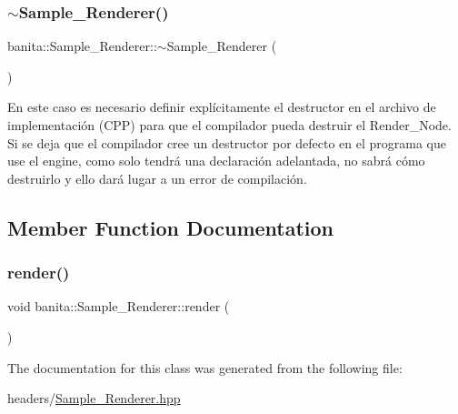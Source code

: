 \mbox{\label{classbanita_1_1_sample___renderer_a6e8c46345456cc3975348b2d79924183}} 
\subsubsection{\texorpdfstring{$\sim$Sample\_Renderer()}{~Sample\_Renderer()}}
{\footnotesize\ttfamily banita\+::\+Sample\+\_\+\+Renderer\+::$\sim$\+Sample\+\_\+\+Renderer (\begin{DoxyParamCaption}{ }\end{DoxyParamCaption})}

En este caso es necesario definir explícitamente el destructor en el archivo de implementación (C\+PP) para que el compilador pueda destruir el Render\+\_\+\+Node. Si se deja que el compilador cree un destructor por defecto en el programa que use el engine, como solo tendrá una declaración adelantada, no sabrá cómo destruirlo y ello dará lugar a un error de compilación. 

\subsection{Member Function Documentation}
\mbox{\label{classbanita_1_1_sample___renderer_aa4b50327809ca20efcfda16117f237d1}} 
\subsubsection{\texorpdfstring{render()}{render()}}
{\footnotesize\ttfamily void banita\+::\+Sample\+\_\+\+Renderer\+::render (\begin{DoxyParamCaption}{ }\end{DoxyParamCaption})}



The documentation for this class was generated from the following file\+:\begin{DoxyCompactItemize}
\item 
headers/\mbox{\hyperlink{_sample___renderer_8hpp}{Sample\+\_\+\+Renderer.\+hpp}}\end{DoxyCompactItemize}
